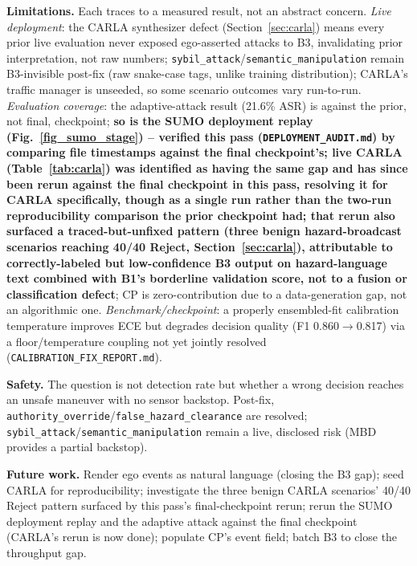 \documentclass[conference]{IEEEtran}
\begin{document}
\textbf{Limitations.} \label{sec:limitations} Each traces to a measured result, not an abstract concern. \emph{Live deployment}: the CARLA synthesizer defect (Section~\ref{sec:carla}) means every prior live evaluation never exposed ego-asserted attacks to B3, invalidating prior interpretation, not raw numbers; \texttt{sybil\_attack}/\texttt{semantic\_manipulation} remain B3-invisible post-fix (raw snake-case tags, unlike training distribution); CARLA's traffic manager is unseeded, so some scenario outcomes vary run-to-run. \emph{Evaluation coverage}: the adaptive-attack result (21.6\% ASR) is against the prior, not final, checkpoint; \textbf{so is the SUMO deployment replay (Fig.~\ref{fig_sumo_stage}) -- verified this pass (\texttt{DEPLOYMENT\_AUDIT.md}) by comparing file timestamps against the final checkpoint's; live CARLA (Table~\ref{tab:carla}) was identified as having the same gap and has since been rerun against the final checkpoint in this pass, resolving it for CARLA specifically, though as a single run rather than the two-run reproducibility comparison the prior checkpoint had; that rerun also surfaced a traced-but-unfixed pattern (three benign hazard-broadcast scenarios reaching 40/40 Reject, Section~\ref{sec:carla}), attributable to correctly-labeled but low-confidence B3 output on hazard-language text combined with B1's borderline validation score, not to a fusion or classification defect}; CP is zero-contribution due to a data-generation gap, not an algorithmic one. \emph{Benchmark/checkpoint}: a properly ensembled-fit calibration temperature improves ECE but degrades decision quality (F1 0.860$\to$0.817) via a floor/temperature coupling not yet jointly resolved (\texttt{CALIBRATION\_FIX\_REPORT.md}).

\textbf{Safety.} The question is not detection rate but whether a wrong decision reaches an unsafe maneuver with no sensor backstop. Post-fix, \texttt{authority\_override}/\texttt{false\_hazard\_clearance} are resolved; \texttt{sybil\_attack}/\texttt{semantic\_manipulation} remain a live, disclosed risk (MBD provides a partial backstop).

\textbf{Future work.} Render ego events as natural language (closing the B3 gap); seed CARLA for reproducibility; investigate the three benign CARLA scenarios' 40/40 Reject pattern surfaced by this pass's final-checkpoint rerun; rerun the SUMO deployment replay and the adaptive attack against the final checkpoint (CARLA's rerun is now done); populate CP's event field; batch B3 to close the throughput gap.
\end{document}
